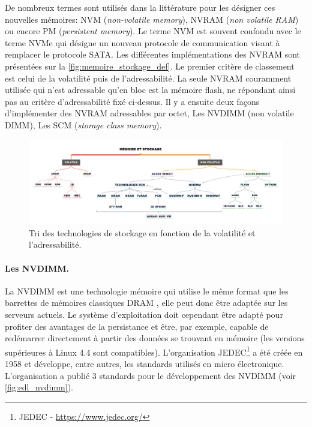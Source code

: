             De nombreux termes sont utilisés dans la littérature pour les désigner ces nouvelles mémoires: NVM (\textit{non-volatile memory}), NVRAM (\textit{non volatile RAM}) ou encore PM (\textit{persistent memory}). Le terme NVM est souvent confondu avec le terme NVMe qui désigne un nouveau protocole de communication visant à remplacer le protocole SATA. Les différentes implémentations des NVRAM sont présentées sur la \autoref{fig:memoire_stockage_def}. Le premier critère de classement est celui de la volatilité puis de l'adressabilité. La seule NVRAM couramment utilisée qui n'est adressable qu'en bloc est la mémoire flash, ne répondant ainsi pas au critère d'adressabilité fixé ci-dessus. Il y a ensuite deux façons d'implémenter des NVRAM adressables par octet, Les NVDIMM (non volatile DIMM), Les SCM (\textit{storage class memory}).
            
            
            \begin{figure}
                \center
                \includegraphics[width=17cm]{images/memoire_stockage_def.png}
                \caption{\label{fig:memoire_stockage_def} Tri des technologies de stockage en fonction de la volatilité et l'adressabilité.}
            \end{figure}
    
    
    
    \paragraph{Les NVDIMM.}\label{sec:nvdimm}
    
        La NVDIMM est une technologie mémoire qui utilise le même format que les barrettes de mémoires classiques DRAM \cite{ChrisEvans2017}, elle peut donc être adaptée sur les serveurs actuels. Le système d'exploitation doit cependant être adapté pour profiter des avantages de la persistance et être, par exemple, capable de redémarrer directement à partir des données se trouvant en mémoire (les versions supérieures à Linux 4.4 sont compatibles). L'organisation JEDEC\footnote{JEDEC - \url{https://www.jedec.org/}} a été créée en 1958 et développe, entre autres, les standards utilisés en micro électronique. L'organisation a publié 3 standards pour le développement des NVDIMM (voir \autoref{fig:edl_nvdimm}).
    
